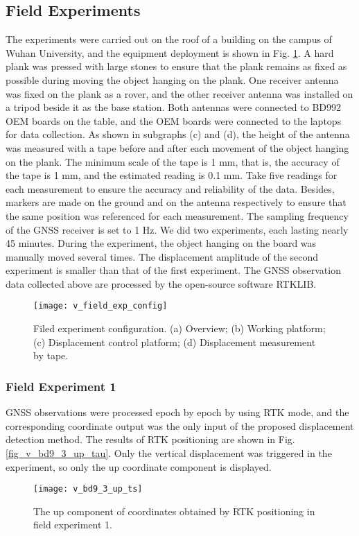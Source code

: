 \documentclass[final,3p,times]{elsarticle}
\begin{document}
	\subsection{Field Experiments}
	The experiments were carried out on the roof of a building on the campus of Wuhan University, and the equipment deployment is shown in Fig. \ref{fig_v_field_exp_config}. 
	A hard plank was pressed with large stones to ensure that the plank remains as fixed as possible during moving the object hanging on the plank. 
	One receiver antenna was fixed on the plank as a rover, and the other receiver antenna was installed on a tripod beside it as the base station. 
	Both antennas were connected to BD992 OEM boards on the table, and the OEM boards were connected to the laptops for data collection. 
	As shown in subgraphs (c) and (d), the height of the antenna was measured with a tape before and after each movement of the object hanging on the plank. 
	\textcolor{r_s}{
		The minimum scale of the tape is 1 mm, that is, the accuracy of the tape is 1 mm, and the estimated reading is 0.1 mm.
		Take five readings for each measurement to ensure the accuracy and reliability of the data.
	}
	Besides, markers are made on the ground and on the antenna respectively to ensure that the same position was referenced for each measurement. 
	The sampling frequency of the GNSS receiver is set to 1 Hz. 
	We did two experiments, each lasting nearly 45 minutes. 
	During the experiment, the object hanging on the board was manually moved several times.
	The displacement amplitude of the second experiment is smaller than that of the first experiment.
	The GNSS observation data collected above are processed by the open-source software RTKLIB\cite{takasu2011rtklib}. 
	\begin{figure}[htbp]
		\centering
		\texttt{[image: v\_field\_exp\_config]}
		\caption{Filed experiment configuration. (a) Overview; (b) Working platform; (c) Displacement control platform; (d) Displacement measurement by tape. }
		\label{fig_v_field_exp_config}
	\end{figure} 
	
	\subsubsection{Field Experiment 1}%
	GNSS observations were processed epoch by epoch by using RTK mode, and the corresponding coordinate output was the only input of the proposed displacement detection method.
	The results of RTK positioning are shown in Fig. \ref{fig_v_bd9_3_up_tau}.
	Only the vertical displacement was triggered in the experiment, so only the up coordinate component is displayed. 
	\begin{figure}[htbp]
		\centering
		\texttt{[image: v\_bd9\_3\_up\_ts]}
		\caption{The up component of coordinates obtained by RTK positioning in field experiment 1.}
		\label{fig_v_bd9_3_up_ts}
	\end{figure} 
	
\end{document}
